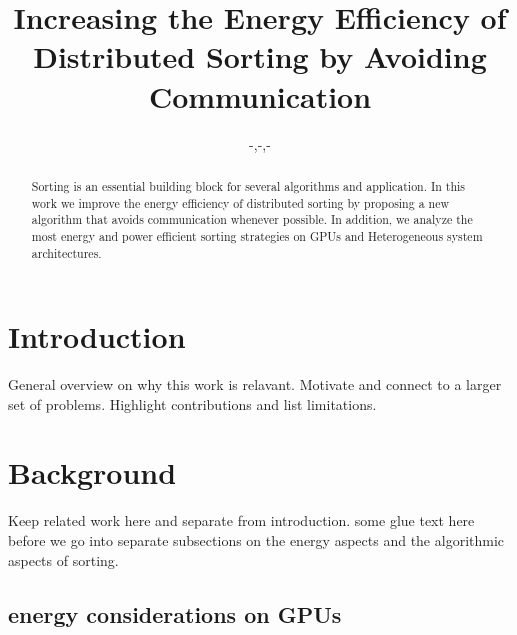 \documentclass{sig-alternate}
\begin{document}
%

\title{Increasing the Energy Efficiency of Distributed Sorting by Avoiding Communication}


\author{
  -,-,-
}

\maketitle
\begin{abstract}
Sorting is an essential building block for several algorithms and application. In this work we improve the energy efficiency of distributed sorting by proposing a new algorithm that avoids communication whenever possible. In addition, we analyze the most energy and power efficient sorting strategies on GPUs and Heterogeneous system architectures.
\end{abstract}




\section{Introduction}
General overview on why this work is relavant. Motivate and connect to a larger set of problems. Highlight contributions and list limitations.


\section{Background}
Keep related work here and separate from introduction. some glue text here before we go into separate subsections on the energy aspects and the algorithmic aspects of sorting.

\subsection{energy considerations on GPUs}
\end{document}
